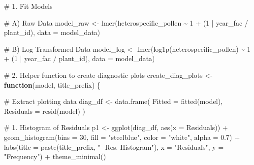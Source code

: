 \documentclass[
  letterpaper,
  DIV=11,
  numbers=noendperiod]{scrartcl}
\newenvironment{Shaded}{\begin{snugshade}}{\end{snugshade}}
\newcommand{\AttributeTok}[1]{\textcolor[rgb]{0.40,0.45,0.13}{#1}}
\newcommand{\CommentTok}[1]{\textcolor[rgb]{0.37,0.37,0.37}{#1}}
\newcommand{\ControlFlowTok}[1]{\textcolor[rgb]{0.00,0.23,0.31}{\textbf{#1}}}
\newcommand{\DecValTok}[1]{\textcolor[rgb]{0.68,0.00,0.00}{#1}}
\newcommand{\FloatTok}[1]{\textcolor[rgb]{0.68,0.00,0.00}{#1}}
\newcommand{\FunctionTok}[1]{\textcolor[rgb]{0.28,0.35,0.67}{#1}}
\newcommand{\NormalTok}[1]{\textcolor[rgb]{0.00,0.23,0.31}{#1}}
\newcommand{\OtherTok}[1]{\textcolor[rgb]{0.00,0.23,0.31}{#1}}
\newcommand{\SpecialCharTok}[1]{\textcolor[rgb]{0.37,0.37,0.37}{#1}}
\newcommand{\StringTok}[1]{\textcolor[rgb]{0.13,0.47,0.30}{#1}}
\begin{document}
\begin{Shaded}
\begin{Highlighting}[]
\CommentTok{\# 1. Fit Models}

\CommentTok{\# A) Raw Data}
\NormalTok{model\_raw }\OtherTok{\textless{}{-}} \FunctionTok{lmer}\NormalTok{(heterospecific\_pollen }\SpecialCharTok{\textasciitilde{}} \DecValTok{1} \SpecialCharTok{+}\NormalTok{ (}\DecValTok{1} \SpecialCharTok{|}\NormalTok{ year\_fac }\SpecialCharTok{/}\NormalTok{ plant\_id), }\AttributeTok{data =}\NormalTok{ model\_data)}

\CommentTok{\# B) Log{-}Transformed Data}
\NormalTok{model\_log }\OtherTok{\textless{}{-}} \FunctionTok{lmer}\NormalTok{(}\FunctionTok{log1p}\NormalTok{(heterospecific\_pollen) }\SpecialCharTok{\textasciitilde{}} \DecValTok{1} \SpecialCharTok{+}\NormalTok{ (}\DecValTok{1} \SpecialCharTok{|}\NormalTok{ year\_fac }\SpecialCharTok{/}\NormalTok{ plant\_id), }\AttributeTok{data =}\NormalTok{ model\_data)}

\CommentTok{\# 2. Helper function to create diagnostic plots}
\NormalTok{create\_diag\_plots }\OtherTok{\textless{}{-}} \ControlFlowTok{function}\NormalTok{(model, title\_prefix) \{}
  
  \CommentTok{\# Extract plotting data}
\NormalTok{  diag\_df }\OtherTok{\textless{}{-}} \FunctionTok{data.frame}\NormalTok{(}
    \AttributeTok{Fitted =} \FunctionTok{fitted}\NormalTok{(model),}
    \AttributeTok{Residuals =} \FunctionTok{resid}\NormalTok{(model)}
\NormalTok{  )}
  
  \CommentTok{\# 1. Histogram of Residuals}
\NormalTok{  p1 }\OtherTok{\textless{}{-}} \FunctionTok{ggplot}\NormalTok{(diag\_df, }\FunctionTok{aes}\NormalTok{(}\AttributeTok{x =}\NormalTok{ Residuals)) }\SpecialCharTok{+}
    \FunctionTok{geom\_histogram}\NormalTok{(}\AttributeTok{bins =} \DecValTok{30}\NormalTok{, }\AttributeTok{fill =} \StringTok{"steelblue"}\NormalTok{, }\AttributeTok{color =} \StringTok{"white"}\NormalTok{, }\AttributeTok{alpha =} \FloatTok{0.7}\NormalTok{) }\SpecialCharTok{+}
    \FunctionTok{labs}\NormalTok{(}\AttributeTok{title =} \FunctionTok{paste}\NormalTok{(title\_prefix, }\StringTok{"{-} Res. Histogram"}\NormalTok{), }\AttributeTok{x =} \StringTok{"Residuals"}\NormalTok{, }\AttributeTok{y =} \StringTok{"Frequency"}\NormalTok{) }\SpecialCharTok{+}
    \FunctionTok{theme\_minimal}\NormalTok{()}
  

\end{Highlighting}
\end{Shaded}
\end{document}
